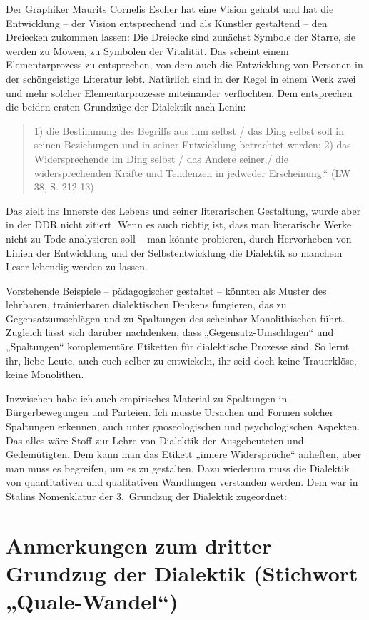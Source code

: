 \documentclass[11pt,a4paper]{article}
\begin{document}
Der Graphiker Maurits Cornelis Escher hat eine Vision gehabt und hat die
Entwicklung -- der Vision entsprechend und als Künstler gestaltend – den
Dreiecken zukommen lassen: Die Dreiecke sind zunächst Symbole der Starre, sie
werden zu Möwen, zu Symbolen der Vitalität. Das scheint einem Elementarprozess
zu entsprechen, von dem auch die Entwicklung von Personen in der schöngeistige
Literatur lebt. Natürlich sind in der Regel in einem Werk zwei und mehr
solcher Elementarprozesse miteinander verflochten. Dem entsprechen die beiden
ersten Grundzüge der Dialektik nach Lenin:
\begin{quote}
  1) die Bestimmung des Begriffs aus ihm selbst / das Ding selbst soll in
  seinen Beziehungen und in seiner Entwicklung betrachtet werden; 2) das
  Widersprechende im Ding selbst / das Andere seiner,/ die widersprechenden
  Kräfte und Tendenzen in jedweder Erscheinung.“ (LW 38, S. 212-13)
\end{quote}
Das zielt ins Innerste des Lebens und seiner literarischen Gestaltung, wurde
aber in der DDR nicht zitiert. Wenn es auch richtig ist, dass man literarische
Werke nicht zu Tode analysieren soll – man könnte probieren, durch Hervorheben
von Linien der Entwicklung und der Selbstentwicklung die Dialektik so manchem
Leser lebendig werden zu lassen.

Vorstehende Beispiele – pädagogischer gestaltet – könnten als Muster des
lehrbaren, trainierbaren dialektischen Denkens fungieren, das zu
Gegensatzumschlägen und zu Spaltungen des scheinbar Monolithischen führt.
Zugleich lässt sich darüber nachdenken, dass „Gegensatz-Umschlagen“ und
„Spaltungen“ komplementäre Etiketten für dialektische Prozesse sind. So lernt
ihr, liebe Leute, auch euch selber zu entwickeln, ihr seid doch keine
Trauerklöse, keine Monolithen.

Inzwischen habe ich auch empirisches Material zu Spaltungen in
Bürgerbewegungen und Parteien. Ich musste Ursachen und Formen solcher
Spaltungen erkennen, auch unter gnoseologischen und psychologischen Aspekten.
Das alles wäre Stoff zur Lehre von Dialektik der Ausgebeuteten und
Gedemütigten. Dem kann man das Etikett „innere Widersprüche“ anheften, aber
man muss es begreifen, um es zu gestalten. Dazu wiederum muss die Dialektik
von quantitativen und qualitativen Wandlungen verstanden werden. Dem war in
Stalins Nomenklatur der 3.~Grundzug der Dialektik zugeordnet:

\section{Anmerkungen zum dritter Grundzug der Dialektik (Stichwort
  „Quale-Wandel“)} 
\end{document}
